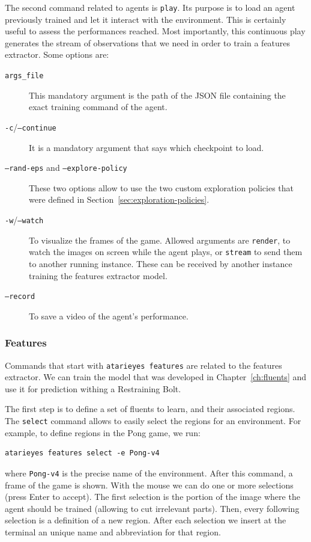 The second command related to agents is \texttt{play}. Its purpose is to load
an agent previously trained and let it interact with the environment. This is
certainly useful to assess the performances reached. Most importantly, this
continuous play generates the stream of observations that we need in order to
train a features extractor. Some options are:
\begin{description}
	\item [\texttt{args\_file}] This mandatory argument is the path of the JSON
		file containing the exact training command of the agent.
	\item [\texttt{-c}/\texttt{--continue}] It is a mandatory argument that
		says which checkpoint to load.
	\item [\texttt{--rand-eps} {\normalfont and} \texttt{--explore-policy}]
		These two options allow to use the two custom exploration policies that
		were defined in Section~\ref{sec:exploration-policies}.
	\item [\texttt{-w}/\texttt{--watch}] To visualize the frames of the game.
		Allowed arguments are \texttt{render}, to watch the images on screen while
		the agent plays, or \texttt{stream} to send them to another running
		instance. These can be received by another instance training the
		features extractor model.
	\item [\texttt{--record}] To save a video of the agent's performance.
\end{description}


\subsubsection*{Features}

Commands that start with \texttt{atarieyes features} are related to the
features extractor. We can train the model that was developed in
Chapter~\ref{ch:fluents} and use it for prediction withing a
Restraining Bolt.

The first step is to define a set of fluents to learn, and their associated
regions. The \texttt{select} command allows to easily select the regions for
an environment. For example, to define regions in the Pong game, we run:
\begin{verbatim}
atarieyes features select -e Pong-v4
\end{verbatim}
where \texttt{Pong-v4} is the precise name of the environment. After this
command, a frame of the game is shown. With the mouse we can do one or more
selections (press Enter to accept). The first selection is the portion of the
image where the agent should be trained (allowing to cut irrelevant parts).
Then, every following selection is a definition of a new region. After each
selection we insert at the terminal an unique name and abbreviation for that
region.

